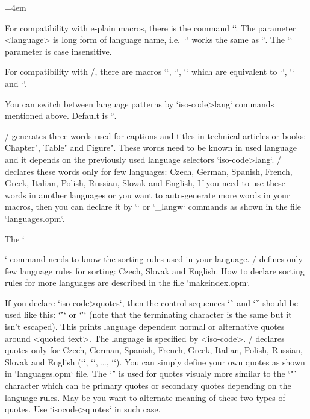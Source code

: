 {\medskip
{\typosize[9/11.5]\emergencystretch=4em 
\noindent \langlist
\par}
\medskip

\new
For compatibility with e-plain macros, there is the command
``. The parameter <language> is long form of
language name, i.e.\ `` works the same as `\cslang`.
The `\uselanguage` parameter is case insensitive.

For compatibility with \csplain/, there are macros `\ehyph`, `\chyph`,
`\shyph` which are equivalent to `\enlang`, `\cslang` and `\sklang`.

You can switch between language patterns by `\<iso-code>lang` commands mentioned
above. Default is `\enlang`.

\OpTeX/ generates three words used for captions and titles in technical
articles or books: \"Chapter", \"Table" and \"Figure". These words need to be known
in used language and it depends on the previously used language selectors
`\<iso-code>lang`. \OpTeX/ declares these words only for few languages:
\new
Czech, German, Spanish, French, Greek, Italian, Polish, Russian, Slovak and 
English, If you need to use these words in another languages or you want to
auto-generate more words in your macros, then you can declare it by 
`\sdef` or `\_langw` commands as shown in the file `languages.opm`.

The `\makeindex` command needs to know the sorting rules used in your language.
\OpTeX/ defines only few language rules for sorting: Czech,
Slovak and English. How to declare sorting rules for more languages are
described in the file `makeindex.opm`.

If you declare `\<iso-code>quotes`, then the control sequences `\"` and `\'`
should be used like this: `\"<quoted text>"` or `\'<quoted text>'` 
(note that the terminating character is the same but it isn't escaped).
This prints language dependent normal or alternative quotes around 
<quoted text>. The language is specified by <iso-code>. \OpTeX/ declares
quotes only for Czech, German, Spanish, French, Greek, Italian, Polish, 
Russian, Slovak and English (`\csquotes`, `\dequotes`, \dots, `\enquotes`). 
You can simply define your own quotes as shown in `languages.opm` file.
The `\"` is used for quotes visualy more similar to the `"` character which
can be primary quotes or secondary quotes depending on the language rules.
May be you want to alternate meaning of these two types of quotes. Use
`\<isocode>quotes\atlquotes` in such case.

}
